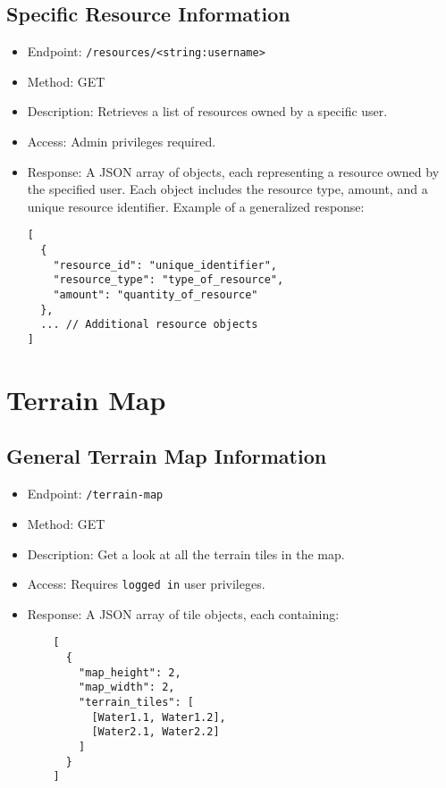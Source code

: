 \documentclass[12pt]{article}
\begin{document}
\subsection{Specific Resource Information}
\begin{itemize}
    \item Endpoint: \texttt{/resources/<string:username>}
    \item Method: GET
    \item Description: Retrieves a list of resources owned by a specific user.
    \item Access: Admin privileges required.
    \item Response: A JSON array of objects, each representing a resource owned by the specified user. Each object includes the resource type, amount, and a unique resource identifier. Example of a generalized response:
    \begin{verbatim}
[
  {
    "resource_id": "unique_identifier",
    "resource_type": "type_of_resource",
    "amount": "quantity_of_resource"
  },
  ... // Additional resource objects
]
    \end{verbatim}
\end{itemize}

\section{Terrain Map}

\subsection{General Terrain Map Information}
\begin{itemize}
    \item Endpoint: \texttt{/terrain-map}
    \item Method: GET
    \item Description: Get a look at all the terrain tiles in the map.
    \item Access: Requires \texttt{logged in} user privileges.
    \item Response: A JSON array of tile objects, each containing:
    \begin{verbatim}
    [
      {
        "map_height": 2,
        "map_width": 2,
        "terrain_tiles": [
          [Water1.1, Water1.2],
          [Water2.1, Water2.2]
        ]
      }
    ]
    \end{verbatim}
\end{itemize}
\end{document}
